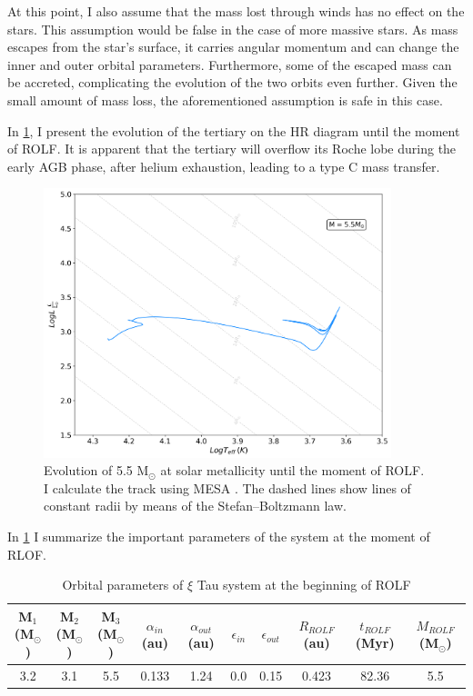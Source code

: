 At this point, I also assume that the mass lost through winds has no effect on the stars. This assumption would be false in the case of more massive stars. As mass escapes from the star's surface, it carries angular momentum and can change the inner and outer orbital parameters. Furthermore, some of the escaped mass can be accreted, complicating the evolution of the two orbits even further. Given the small amount of mass loss, the aforementioned assumption is safe in this case.

In \cref{fig:HR_ROLF}, I present the evolution of the tertiary on the HR diagram until the moment of ROLF. It is apparent that the tertiary will overflow its Roche lobe during the early AGB phase, after helium exhaustion, leading to a type C mass transfer. 
\begin{figure}[H]
    \centering
    \includegraphics[width=0.9\textwidth]{Thesis/graphs/HR_1-1ROLF.pdf}
    \caption{Evolution of 5.5 M$_{\odot}$ at solar metallicity until the moment of ROLF. I calculate the track using MESA \citep{paxton2010modules,paxton2013modules,paxton2015modules,paxton2019modules}. The dashed lines show lines of constant radii by means of the Stefan–Boltzmann law.}
    \label{fig:HR_ROLF}
\end{figure}
In \cref{tab:system_orbit_param_ROLF} I summarize the important parameters of the system at the moment of RLOF. 
\begin{table}[H]
    \begin{adjustbox}{width=1\textwidth}
    \small
    \centering
    \begin{tabular}{| c c c c c c c c c c|}
       M$_1$ (M$_{\odot}$) & 
       M$_2$ (M$_{\odot}$) &
       M$_3$ (M$_{\odot}$) & $\alpha_{in}$ (au) &
       $\alpha_{out}$ (au) &
       $\epsilon_{in}$ &
       $\epsilon_{out}$ &
       $R_{ROLF}$ (au) &
       $t_{ROLF}$ (Myr) &
       $M_{ROLF}$  (M$_{\odot}$) \\
       \hline
       3.2 & 3.1 & 5.5 & 0.133 & 1.24 & 0.0 & 0.15 & 0.423 & 82.36 & 5.5
    \end{tabular}
    \end{adjustbox}
    \caption{ Orbital parameters of $\xi$ Tau system at the beginning of ROLF}
    \label{tab:system_orbit_param_ROLF}
\end{table}

